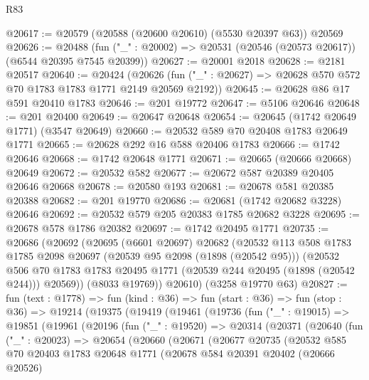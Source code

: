 \begin{lexlean}{R83}
\begin{coremodule}
@20617 := @20579 (@20588 (@20600 @20610) (@5530 @20397 @63)) @20569
@20626 := @20488 (fun ("_" : @20002) => @20531 (@20546 (@20573 @20617)) (@6544 @20395 @7545 @20399))
@20627 := @20001 @2018
@20628 := @2181 @20517
@20640 := @20424
    (@20626 (fun ("_" : @20627) => @20628 @570 @572 @70 @1783 @1783 @1771 @2149 @20569 @2192))
@20645 := @20628 @86 @17 @591 @20410 @1783
@20646 := @201 @19772
@20647 := @5106 @20646
@20648 := @201 @20400
@20649 := @20647 @20648
@20654 := @20645 (@1742 @20649 @1771) (@3547 @20649)
@20660 := @20532 @589 @70 @20408 @1783 @20649 @1771
@20665 := @20628 @292 @16 @588 @20406 @1783
@20666 := @1742 @20646
@20668 := @1742 @20648 @1771
@20671 := @20665 (@20666 @20668) @20649
@20672 := @20532 @582
@20677 := @20672 @587 @20389 @20405 @20646 @20668
@20678 := @20580 @193
@20681 := @20678 @581 @20385 @20388
@20682 := @201 @19770
@20686 := @20681 (@1742 @20682 @3228) @20646
@20692 := @20532 @579 @205 @20383 @1785 @20682 @3228
@20695 := @20678 @578 @1786 @20382
@20697 := @1742 @20495 @1771
@20735 := @20686
    (@20692
      (@20695
        (@6601 @20697)
        @20682
        (@20532
          @113
          @508
          @1783
          @1785
          @2098
          @20697
          (@20539 @95 @2098 (@1898 (@20542 @95)))
          (@20532
            @506
            @70
            @1783
            @1783
            @20495
            @1771
            (@20539 @244 @20495 (@1898 (@20542 @244)))
            @20569))
        (@8033 @19769))
      @20610)
    (@3258 @19770 @63)
@20827 := fun (text : @1778) =>
  fun (kind : @36) =>
  fun (start : @36) =>
  fun (stop : @36) =>
  @19214
    (@19375
      (@19419
        (@19461
          (@19736
            (fun ("_" : @19015) =>
            @19851
              (@19961
                (@20196
                  (fun ("_" : @19520) =>
                  @20314
                    (@20371
                      (@20640
                        (fun ("_" : @20023) =>
                        @20654
                          (@20660
                            (@20671
                              (@20677
                                @20735
                                (@20532
                                  @585
                                  @70
                                  @20403
                                  @1783
                                  @20648
                                  @1771
                                  (@20678
                                    @584
                                    @20391
                                    @20402
                                    (@20666 @20526)

\end{coremodule}
\end{lexlean}
